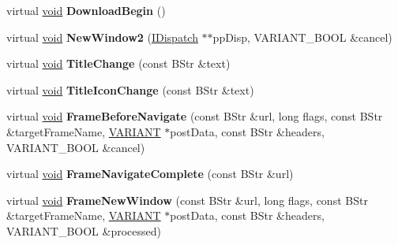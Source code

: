 \begin{DoxyCompactItemize}
\item 
\mbox{\label{struct_d_web_browser_events2_i_f_a08bfa3839853b30ed860714e27616a9d}} 
virtual \hyperlink{interfacevoid}{void} {\bfseries Download\+Begin} ()
\item 
\mbox{\label{struct_d_web_browser_events2_i_f_a792cdaae837a64373b8bd2f8a1e38493}} 
virtual \hyperlink{interfacevoid}{void} {\bfseries New\+Window2} (\hyperlink{interface_i_dispatch}{I\+Dispatch} $\ast$$\ast$pp\+Disp, V\+A\+R\+I\+A\+N\+T\+\_\+\+B\+O\+OL \&cancel)
\item 
\mbox{\label{struct_d_web_browser_events2_i_f_aa9725be358e9d884191b27d42292dad6}} 
virtual \hyperlink{interfacevoid}{void} {\bfseries Title\+Change} (const B\+Str \&text)
\item 
\mbox{\label{struct_d_web_browser_events2_i_f_a0fa7e430a9091d4a486215f964af6136}} 
virtual \hyperlink{interfacevoid}{void} {\bfseries Title\+Icon\+Change} (const B\+Str \&text)
\item 
\mbox{\label{struct_d_web_browser_events2_i_f_a4e9ee4ff289af202912db528b7c847ee}} 
virtual \hyperlink{interfacevoid}{void} {\bfseries Frame\+Before\+Navigate} (const B\+Str \&url, long flags, const B\+Str \&target\+Frame\+Name, \hyperlink{structtag_v_a_r_i_a_n_t}{V\+A\+R\+I\+A\+NT} $\ast$post\+Data, const B\+Str \&headers, V\+A\+R\+I\+A\+N\+T\+\_\+\+B\+O\+OL \&cancel)
\item 
\mbox{\label{struct_d_web_browser_events2_i_f_a13e221261fdab1308d36363e01d1df81}} 
virtual \hyperlink{interfacevoid}{void} {\bfseries Frame\+Navigate\+Complete} (const B\+Str \&url)
\item 
\mbox{\label{struct_d_web_browser_events2_i_f_a0c68d90fe621f1911b7654d16c062547}} 
virtual \hyperlink{interfacevoid}{void} {\bfseries Frame\+New\+Window} (const B\+Str \&url, long flags, const B\+Str \&target\+Frame\+Name, \hyperlink{structtag_v_a_r_i_a_n_t}{V\+A\+R\+I\+A\+NT} $\ast$post\+Data, const B\+Str \&headers, V\+A\+R\+I\+A\+N\+T\+\_\+\+B\+O\+OL \&processed)
\item 
$$
\end{DoxyCompactItemize}
